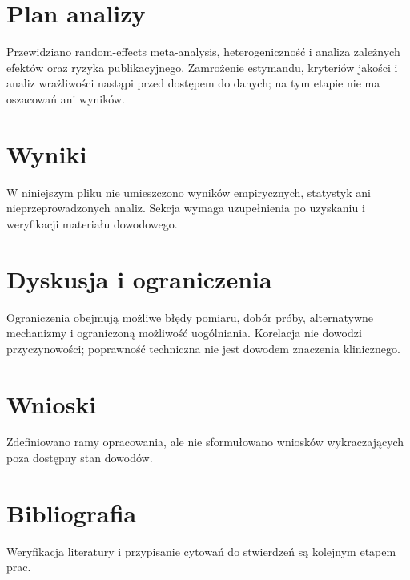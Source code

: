 \documentclass[11pt,a4paper]{article}
\begin{document}
\section{Plan analizy}

Przewidziano random-effects meta-analysis, heterogeniczność i analiza zależnych efektów oraz ryzyka publikacyjnego. Zamrożenie estymandu, kryteriów jakości i analiz wrażliwości nastąpi przed dostępem do danych; na tym etapie nie ma oszacowań ani wyników.

\section{Wyniki}

W niniejszym pliku nie umieszczono wyników empirycznych, statystyk ani nieprzeprowadzonych analiz. Sekcja wymaga uzupełnienia po uzyskaniu i weryfikacji materiału dowodowego.

\section{Dyskusja i ograniczenia}

Ograniczenia obejmują możliwe błędy pomiaru, dobór próby, alternatywne mechanizmy i ograniczoną możliwość uogólniania. Korelacja nie dowodzi przyczynowości; poprawność techniczna nie jest dowodem znaczenia klinicznego.

\section{Wnioski}

Zdefiniowano ramy opracowania, ale nie sformułowano wniosków wykraczających poza dostępny stan dowodów.

\section*{Bibliografia}

Weryfikacja literatury i przypisanie cytowań do stwierdzeń są kolejnym etapem prac.
\end{document}
